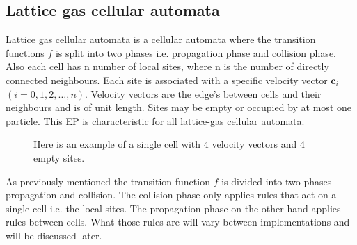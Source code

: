 \documentclass[a4paper,10pt]{article}
\begin{document}
\subsection{Lattice gas cellular automata}
Lattice gas cellular automata is a cellular automata where the transition functions $f$ is split into two phases i.e. propagation phase and collision phase. Also each cell has n number of local sites, where n is the number of directly connected neighbours. Each site is associated with a specific velocity vector $\textbf{c}_{i}$ $( i = 0,1,2,\dots,n)$. Velocity vectors are the edge's between cells and their neighbours and is of unit length. Sites may be empty or occupied by at most one particle. This \gls{EP} is characteristic for all lattice-gas cellular automata.   
\begin{figure}[H]
  \centering
  \caption{Here is an example of a single cell with 4 velocity vectors and 4 empty sites.}
  \label{figure:single-cell}
\end{figure}
\noindent As previously mentioned the transition function $f$ is divided into two phases propagation and collision.
The collision phase only applies rules that act on a single cell i.e. the local sites.
The propagation phase on the other hand applies rules between cells. What those rules are will vary between implementations and will be discussed later.
\end{document}
